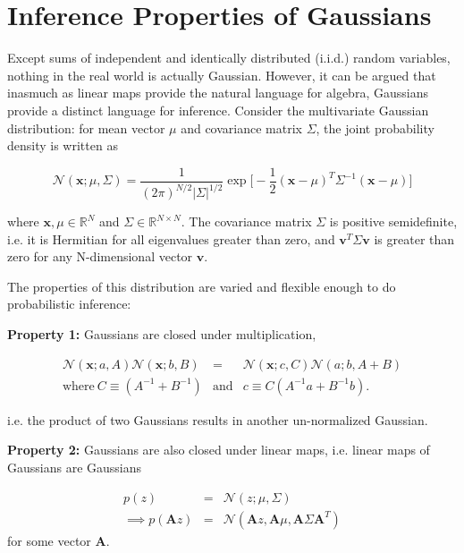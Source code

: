 \documentclass[12pt]{article}
\begin{document}
\section{Inference Properties of Gaussians}
Except sums of independent and identically distributed (i.i.d.) random variables, nothing in the real world is actually Gaussian. However, it can be argued that inasmuch as linear maps provide the natural language for algebra, Gaussians provide a distinct language for inference. Consider the multivariate Gaussian distribution: for mean vector $\mu$ and covariance matrix $\Sigma$, the joint probability density is written as

\begin{equation}
\mathcal{N}(\textbf{x};\mu,\Sigma)=\frac{1}{(2\pi)^{N/2}|\Sigma|^{1/2}}\exp\Bigg[-\frac{1}{2}(\textbf{x}-\mu)^{T}\Sigma^{-1}(\textbf{x}-\mu)\Bigg]
\end{equation}

where $\textbf{x}, \mu\in\mathbb{R}^{N}$ and $\Sigma\in\mathbb{R}^{N\times N}$. The covariance matrix $\Sigma$ is positive semidefinite, i.e. it is Hermitian for all eigenvalues greater than zero, and $\textbf{v}^{T}\Sigma\textbf{v}$ is greater than zero for any N-dimensional vector $\textbf{v}$. %

The properties of this distribution are varied and flexible enough to do probabilistic inference:

\textbf{Property 1:} Gaussians are closed under multiplication,

\begin{eqnarray*}
\mathcal{N}(\textbf{x}; a, A)\mathcal{N}(\textbf{x}; b, B) & = & \mathcal{N}(\textbf{x}; c, C)\mathcal{N}(a; b, A+B) \\
            \mbox{where} \ C\equiv(A^{-1}+B^{-1}) & \mbox{and} & c\equiv C(A^{-1}a+B^{-1}b).
\end{eqnarray*}

 i.e. the product of two Gaussians results in another un-normalized Gaussian.

\textbf{Property 2:} Gaussians are also closed under linear maps, i.e. linear maps of Gaussians are Gaussians

\begin{eqnarray*}
p(z) & = & \mathcal{N}(z; \mu, \Sigma) \\
           \implies p(\textbf{A}z) & = & \mathcal{N}(\textbf{A}z, \textbf{A}\mu, \textbf{A}\Sigma\textbf{A}^{T})
\end{eqnarray*}
for some vector $\textbf{A}$.
\end{document}
